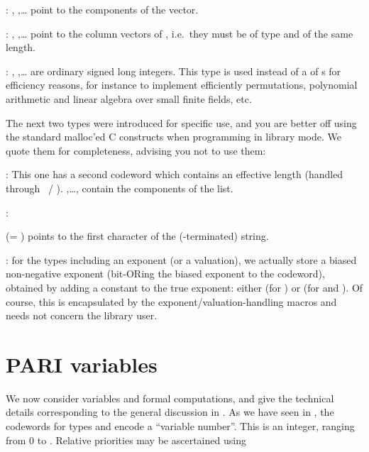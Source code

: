 :%
, ,\dots {} point to the components of the
vector.

: ,
,\dots {} point to the column vectors of ,
i.e.~they must be of type  and of the same length.

:
, ,\dots {} are ordinary signed long
integers. This type is used instead of a  of s for
efficiency reasons, for instance to implement efficiently permutations,
polynomial arithmetic and linear algebra over small finite fields, etc.

\noindent The next two types were introduced for specific  use, and
you are better off using the standard malloc'ed C constructs when programming
in library mode. We quote them for completeness, advising you not to use
them:

: This one has a
second codeword which contains an effective length (handled through
~/ ). ,\dots, 
contain the components of the list.

:%

 (= ) points to the first character of the
(-terminated) string.

: for the types including an exponent (or a
valuation), we actually store a biased non-negative exponent (bit-ORing the
biased exponent to the codeword), obtained by adding a constant to the true
exponent: either  (for ) or  (for
 and ). Of course, this is encapsulated by the
exponent/valuation-handling macros and needs not concern the library user.

\section{PARI variables}\label{se:vars} 

\noindent We now consider variables and formal computations, and give the
technical details corresponding to the general discussion in
. As we have seen in , the codewords for
types  and  encode a ``variable number''. This is an
integer, ranging from $0$ to . Relative priorities may be
ascertained using

